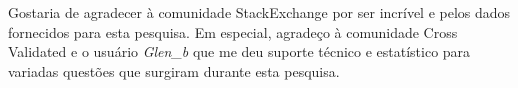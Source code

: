 Gostaria de agradecer à comunidade StackExchange por ser incrível e pelos dados fornecidos para esta pesquisa. Em especial, agradeço à comunidade Cross Validated e o usuário \textit{Glen\_b} que me deu suporte técnico e estatístico para variadas questões que surgiram durante esta pesquisa. 